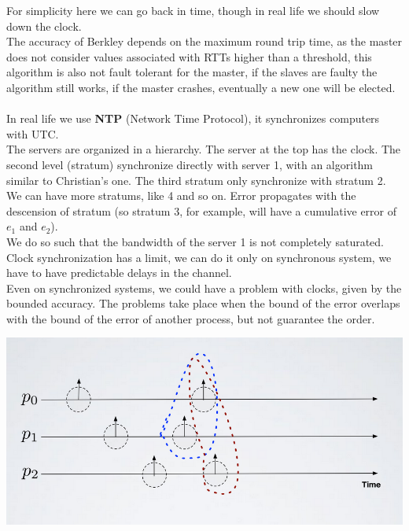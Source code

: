 \documentclass[11pt, a4paper]{article}
\begin{document}
For simplicity here we can go back in time, though in real life we should slow
down the clock.\\
The accuracy of Berkley depends on the maximum round trip time, as the master does not consider values associated with RTTs higher than a threshold, this algorithm is also not fault tolerant for the master, if the slaves are faulty the algorithm still works, if the master crashes, eventually a new one will be elected.\\\\
In real life we use \textbf{NTP} (Network Time Protocol), it synchronizes computers with
UTC.\\
The servers are organized in a hierarchy. The server at the top has the clock. The
second level (stratum) synchronize directly with server 1, with an algorithm
similar to Christian's one. The  third stratum  only synchronize with stratum 2.\\
We can
have more stratums, like 4 and so on. Error propagates with the descension of
stratum (so stratum 3, for example, will have a cumulative error of $e_1$ and $e_2$).\\
We
do so such that the bandwidth of the server 1 is not completely saturated.\\
Clock synchronization has a limit, we can do it only on synchronous system, we
have to have predictable delays in the channel.\\
Even on synchronized systems, we could have a problem with clocks, given by the
bounded accuracy. The problems take place when the bound of the error overlaps
with the bound of the error of another process, but not guarantee the order.
\begin{center}
    \includegraphics[scale=0.6]{img/synchro_algs/NTP.png}
\end{center}
\end{document}
